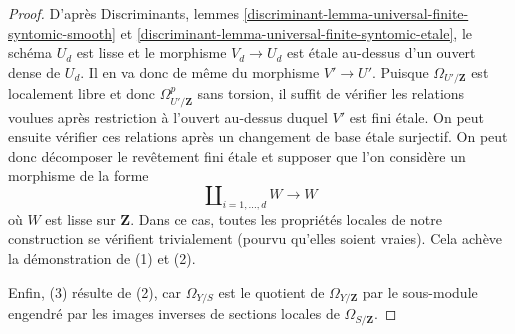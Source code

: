 \begin{proof}
\medskip\noindent
D'après Discriminants, lemmes
\ref{discriminant-lemma-universal-finite-syntomic-smooth} et
\ref{discriminant-lemma-universal-finite-syntomic-etale},
le schéma $U_d$ est lisse et le morphisme $V_d \to U_d$
est étale au-dessus d'un ouvert dense de $U_d$.
Il en va donc de même du morphisme
$V' \to U'$. Puisque $\Omega_{U'/\mathbf{Z}}$ est localement libre et donc
$\Omega^p_{U'/\mathbf{Z}}$ sans
torsion, il suffit de vérifier les relations voulues
après restriction à l'ouvert au-dessus duquel $V'$ est fini étale.
On peut ensuite vérifier ces relations après un changement de base étale
surjectif. On peut donc décomposer le revêtement fini étale
et supposer que l'on considère un morphisme de la forme
$$
\coprod\nolimits_{i = 1, \ldots, d} W \longrightarrow W
$$
où $W$ est lisse sur $\mathbf{Z}$.
Dans ce cas, toutes les propriétés locales de notre construction se vérifient trivialement
(pourvu qu'elles soient vraies). Cela achève la démonstration de (1) et (2).

\medskip\noindent
Enfin, (3) résulte de (2), car $\Omega_{Y/S}$
est le quotient de $\Omega_{Y/\mathbf{Z}}$ par le sous-module
engendré par les images inverses de sections locales de $\Omega_{S/\mathbf{Z}}$.
\end{proof}

